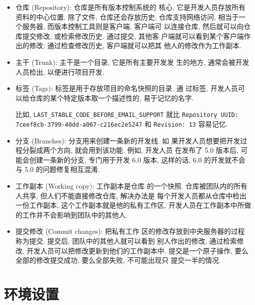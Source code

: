 \documentclass[nofonts, oneside]{ctexbook}
\begin{document}
\begin{itemize}
  \item 仓库 (Repository): 仓库是所有版本控制系统的
      核心, 它是开发人员存放所有资料的中心位置. 除了文件, 仓库还会存放历史.
      仓库支持网络访问, 相当于一个服务器, 而版本控制工具则是客户端. 客户端可
      以连接仓库, 然后就可以向仓库提交修改, 或检索修改历史. 通过提交, 其他客
      户端就可以看到某个客户端作出的修改; 通过检查修改历史, 客户端就可以把其
      他人的修改作为工作副本.

  \item 主干 (Trunk): 主干是一个目录, 它是所有主要开发发
      生的地方, 通常会被开发人员检出, 以便进行项目开发.

  \item 标签 (Tags): 标签是用于存放项目的命名快照的目录. 通
      过标签, 开发人员可以给仓库的某个特定版本取一个描述性的, 易于记忆的名字.

      比如, \texttt{LAST\_STABLE\_CODE\_BEFORE\_EMAIL\_SUPPORT} 就比
      \texttt{Repository UUID: 7ceef8cb-3799-40dd-a067-c216ec2e5247} 和
      \texttt{Revision: 13} 容易记忆.

  \item 分支 (Branches): 分支用来创建一条新的开发线. 如
      果开发人员想要把开发过程分裂成两个方向, 就会用到该功能. 例如, 开发人员
      在发布了 5.0 版本后, 可能会创建一条新的分支, 专门用于开发 6.0 版本,
      这样的话, 6.0 的开发就不会与 5.0 的问题修复相互混淆.

  \item 工作副本 (Working copy): 工作副本是仓库
      的一个快照. 仓库被团队内的所有人共享, 但人们不能直接修改仓库, 解决办法是
      每个开发人员都从仓库中检出一份工作副本, 这个工作副本就是他的私有工作区,
      开发人员在工作副本中所做的工作并不会影响到团队中的其他人.

  \item 提交修改 (Commit changes): 把私有工作
      区的修改存放到中央服务器的过程称为提交. 提交后, 团队中的其他人就可以看到
      别人作出的修改, 通过检索修改, 开发人员可以把修改更新到他们的工作副本中.
      提交是一个原子操作, 要么全部的修改提交成功, 要么全部失败, 不可能出现只
      提交一半的情况.
\end{itemize}

\chapter{环境设置}
\label{chap:environment_setup}
\end{document}
